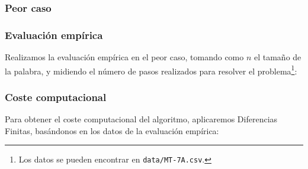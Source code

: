 

\subsubsection*{Peor caso}


\subsubsection*{Evaluación empírica}
Realizamos la evaluación empírica en el peor caso, tomando como $n$ el tamaño de la palabra, y midiendo el número de pasos realizados para resolver el problema\footnote{Los datos se pueden encontrar en \texttt{data/MT-7A.csv}.}:



\subsubsection*{Coste computacional}
Para obtener el coste computacional del algoritmo, aplicaremos Diferencias Finitas, basándonos en los datos de la evaluación empírica:


